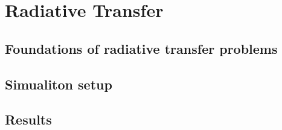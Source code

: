 

\chapter{Radiative Transfer}

\section{Foundations of radiative transfer problems}
\section{Simualiton setup}
\section{Results}







